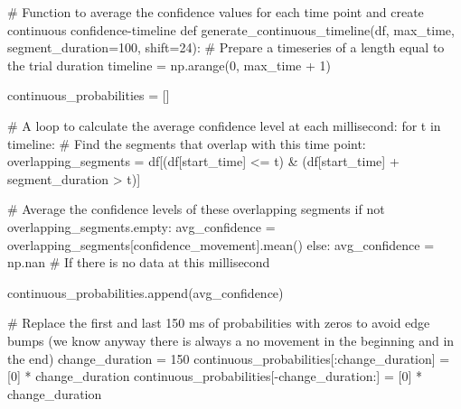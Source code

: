 \documentclass[
  letterpaper,
  DIV=11,
  numbers=noendperiod]{scrreprt}
\newenvironment{Shaded}{\begin{snugshade}}{\end{snugshade}}
\newcommand{\CommentTok}[1]{\textcolor[rgb]{0.37,0.37,0.37}{#1}}
\newcommand{\ControlFlowTok}[1]{\textcolor[rgb]{0.00,0.23,0.31}{#1}}
\newcommand{\DecValTok}[1]{\textcolor[rgb]{0.68,0.00,0.00}{#1}}
\newcommand{\KeywordTok}[1]{\textcolor[rgb]{0.00,0.23,0.31}{#1}}
\newcommand{\NormalTok}[1]{\textcolor[rgb]{0.00,0.23,0.31}{#1}}
\newcommand{\OperatorTok}[1]{\textcolor[rgb]{0.37,0.37,0.37}{#1}}
\newcommand{\StringTok}[1]{\textcolor[rgb]{0.13,0.47,0.30}{#1}}
\begin{document}
\begin{Shaded}
\begin{Highlighting}[]
\CommentTok{\# Function to average the confidence values for each time point and create continuous confidence{-}timeline}
\KeywordTok{def}\NormalTok{ generate\_continuous\_timeline(df, max\_time, segment\_duration}\OperatorTok{=}\DecValTok{100}\NormalTok{, shift}\OperatorTok{=}\DecValTok{24}\NormalTok{):}
    \CommentTok{\# Prepare a timeseries of a length equal to the trial duration}
\NormalTok{    timeline }\OperatorTok{=}\NormalTok{ np.arange(}\DecValTok{0}\NormalTok{, max\_time }\OperatorTok{+} \DecValTok{1}\NormalTok{)}

\NormalTok{    continuous\_probabilities }\OperatorTok{=}\NormalTok{ []}

    \CommentTok{\# A loop to calculate the average confidence level at each millisecond:}
    \ControlFlowTok{for}\NormalTok{ t }\KeywordTok{in}\NormalTok{ timeline:}
        \CommentTok{\# Find the segments that overlap with this time point:}
\NormalTok{        overlapping\_segments }\OperatorTok{=}\NormalTok{ df[(df[}\StringTok{\textquotesingle{}start\_time\textquotesingle{}}\NormalTok{] }\OperatorTok{\textless{}=}\NormalTok{ t) }\OperatorTok{\&}\NormalTok{ (df[}\StringTok{\textquotesingle{}start\_time\textquotesingle{}}\NormalTok{] }\OperatorTok{+}\NormalTok{ segment\_duration }\OperatorTok{\textgreater{}}\NormalTok{ t)]}
        
        \CommentTok{\# Average the confidence levels of these overlapping segments}
        \ControlFlowTok{if} \KeywordTok{not}\NormalTok{ overlapping\_segments.empty:}
\NormalTok{            avg\_confidence }\OperatorTok{=}\NormalTok{ overlapping\_segments[}\StringTok{\textquotesingle{}confidence\_movement\textquotesingle{}}\NormalTok{].mean()}
        \ControlFlowTok{else}\NormalTok{:}
\NormalTok{            avg\_confidence }\OperatorTok{=}\NormalTok{ np.nan  }\CommentTok{\# If there is no data at this millisecond}

\NormalTok{        continuous\_probabilities.append(avg\_confidence)}

    \CommentTok{\# Replace the first and last 150 ms of probabilities with zeros to avoid edge bumps (we know anyway there is always a no movement in the beginning and in the end)}
\NormalTok{    change\_duration }\OperatorTok{=} \DecValTok{150}
\NormalTok{    continuous\_probabilities[:change\_duration] }\OperatorTok{=}\NormalTok{ [}\DecValTok{0}\NormalTok{] }\OperatorTok{*}\NormalTok{ change\_duration}
\NormalTok{    continuous\_probabilities[}\OperatorTok{{-}}\NormalTok{change\_duration:] }\OperatorTok{=}\NormalTok{ [}\DecValTok{0}\NormalTok{] }\OperatorTok{*}\NormalTok{ change\_duration}


\end{Highlighting}
\end{Shaded}
\end{document}
